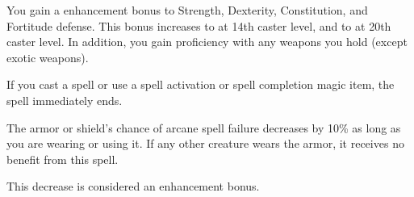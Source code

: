 \begin{spellheader}
\end{spellheader}
\begin{spellcontent}
    \begin{spelltargetinginfo}
    \end{spelltargetinginfo}
    \begin{spelleffects}
        \spelleffect You gain a  enhancement bonus to Strength, Dexterity, Constitution, and Fortitude defense. This bonus increases to  at 14th caster level, and to  at 20th caster level. In addition, you gain proficiency with any weapons you hold (except exotic weapons).
        \spelldur{\durshort \dismissable}
    \end{spelleffects}
\end{spellcontent}
\begin{spellfooter}
    \spellnotes If you cast a spell or use a spell activation or spell completion magic item, the spell immediately ends.
\end{spellfooter}

\begin{spellheader}
    \begin{spelltargetinginfo}
    \end{spelltargetinginfo}
\end{spellheader}
\begin{spellcontent}
    \begin{spelleffects}
        \spelleffect The armor or shield's chance of arcane spell failure decreases by 10\% as long as you are wearing or using it. If any other creature wears the armor, it receives no benefit from this spell.
        \spelldur{\durext \dismissable}
    \end{spelleffects}
\end{spellcontent}
\begin{spellfooter}
    \spellnotes This decrease is considered an enhancement bonus.
\end{spellfooter}%

